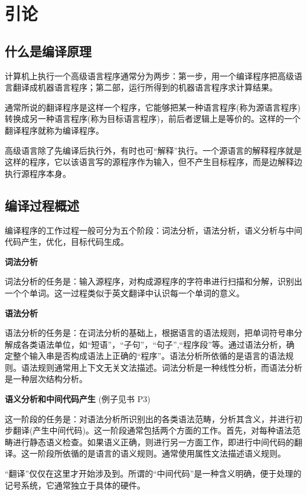 \newpage
\section{引论}
\subsection{什么是编译原理}

计算机上执行一个高级语言程序通常分为两步：第一步，用一个编译程序把高级语言翻译成机器语言程序；第二部，运行所得到的机器语言程序求计算结果。

通常所说的翻译程序是这样一个程序，它能够把某一种语言程序(称为源语言程序)转换成另一种语言程序(称为目标语言程序)，前后者逻辑上是等价的。这样的一个翻译程序就称为编译程序。

高级语言除了先编译后执行外，有时也可``解释''执行。一个源语言的解释程序就是这样的程序，它以该语言写的源程序作为输入，但不产生目标程序，而是边解释边执行源程序本身。

\subsection{编译过程概述}

编译程序的工作过程一般可分为五个阶段：\textcolor{tip}{词法分析，语法分析，语义分析与中间代码产生，优化，目标代码生成。}

\noindent\textbf{词法分析}

词法分析的任务是：输入源程序，对构成源程序的字符串进行扫描和分解，识别出一个个单词。这一过程类似于英文翻译中认识每一个单词的意义。

\noindent\textbf{语法分析}

语法分析的任务是：在词法分析的基础上，根据语言的语法规则，把单词符号串分解成各类语法单位，如``短语''，``子句''，``句子'',``程序段''等。通过语法分析，确定整个输入串是否构成语法上正确的``程序''。语法分析所依循的是语言的语法规则。语法规则通常用上下文无关文法描述。词法分析是一种线性分析，而语法分析是一种层次结构分析。

\noindent\textbf{语义分析和中间代码产生} (例子见书 P3)

这一阶段的任务是：对语法分析所识别出的各类语法范畴，分析其含义，并进行初步翻译(产生中间代码)。这一阶段通常包括两个方面的工作。首先，对每种语法范畴进行静态语义检查。如果语义正确，则进行另一方面工作，即进行中间代码的翻译。这一阶段所依循的是语言的语义规则。通常使用属性文法描述语义规则。

``翻译''仅仅在这里才开始涉及到。所谓的``中间代码''是一种含义明确，便于处理的记号系统，它通常独立于具体的硬件。


